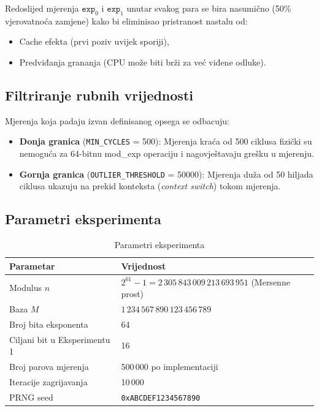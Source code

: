 Redoslijed mjerenja $\texttt{exp}_0$ i $\texttt{exp}_1$ unutar svakog para se bira nasumično (50\% vjerovatnoća zamjene) kako bi eliminisao pristranost nastalu od:
\begin{itemize}
\item Cache efekta (prvi poziv uvijek sporiji),
\item Predviđanja grananja (CPU može biti brži za već viđene odluke).
\end{itemize}

\subsection{Filtriranje rubnih vrijednosti}

Mjerenja koja padaju izvan definisanog opsega se odbacuju:
\begin{itemize}
\item \textbf{Donja granica} (\texttt{MIN\_CYCLES} = 500): Mjerenja kraća od 500 ciklusa fizički su nemoguća za 64-bitnu mod\_exp operaciju i nagovještavaju grešku u mjerenju.
\item \textbf{Gornja granica} (\texttt{OUTLIER\_THRESHOLD} = 50000): Mjerenja duža od 50 hiljada ciklusa ukazuju na prekid konteksta (\textit{context switch}) tokom mjerenja.
\end{itemize}

\subsection{Parametri eksperimenta}

\begin{table}[H]
\centering
\caption{Parametri eksperimenta}
\label{tab:params}
\begin{tabular}{ll}
\toprule
\textbf{Parametar} & \textbf{Vrijednost} \\
\midrule
Modulus $n$ & $2^{61} - 1 = 2\,305\,843\,009\,213\,693\,951$ (Mersenne prost) \\
Baza $M$ & $1\,234\,567\,890\,123\,456\,789$ \\
Broj bita eksponenta & 64 \\
Ciljani bit u Eksperimentu 1 & 16 \\
Broj parova mjerenja & 500\,000 po implementaciji \\
Iteracije zagrijavanja & 10\,000 \\
PRNG seed & \texttt{0xABCDEF1234567890} \\
\bottomrule
\end{tabular}
\end{table}

